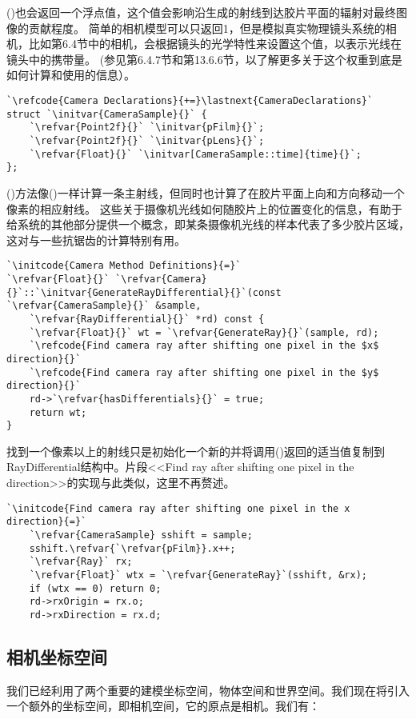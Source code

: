()也会返回一个浮点值，这个值会影响沿生成的射线到达胶片平面的辐射对最终图像的贡献程度。
简单的相机模型可以只返回1，但是模拟真实物理镜头系统的相机，比如第6.4节中的相机，会根据镜头的光学特性来设置这个值，以表示光线在镜头中的携带量。
(参见第6.4.7节和第13.6.6节，以了解更多关于这个权重到底是如何计算和使用的信息）。
\begin{lstlisting}
`\refcode{Camera Declarations}{+=}\lastnext{CameraDeclarations}`
struct `\initvar{CameraSample}{}` {
    `\refvar{Point2f}{}` `\initvar{pFilm}{}`;
    `\refvar{Point2f}{}` `\initvar{pLens}{}`;
    `\refvar{Float}{}` `\initvar[CameraSample::time]{time}{}`;
};
\end{lstlisting}
()方法像()一样计算一条主射线，但同时也计算了在胶片平面上向和方向移动一个像素的相应射线。
这些关于摄像机光线如何随胶片上的位置变化的信息，有助于给系统的其他部分提供一个概念，即某条摄像机光线的样本代表了多少胶片区域，这对与一些抗锯齿的计算特别有用。
\begin{lstlisting}
`\initcode{Camera Method Definitions}{=}`
`\refvar{Float}{}` `\refvar{Camera}{}`::`\initvar{GenerateRayDifferential}{}`(const `\refvar{CameraSample}{}` &sample,
    `\refvar{RayDifferential}{}` *rd) const {
    `\refvar{Float}{}` wt = `\refvar{GenerateRay}{}`(sample, rd);
    `\refcode{Find camera ray after shifting one pixel in the $x$ direction}{}`
    `\refcode{Find camera ray after shifting one pixel in the $y$ direction}{}`
    rd->`\refvar{hasDifferentials}{}` = true;
    return wt;
}
\end{lstlisting}

找到一个像素以上的射线只是初始化一个新的并将调用()返回的适当值复制到RayDifferential结构中。片段<<Find ray after shifting one pixel in the  direction>>的实现与此类似，这里不再赘述。
\begin{lstlisting}
`\initcode{Find camera ray after shifting one pixel in the x direction}{=}`
    `\refvar{CameraSample} sshift = sample;
    sshift.\refvar{`\refvar{pFilm}}.x++;
    `\refvar{Ray}` rx;
    `\refvar{Float}` wtx = `\refvar{GenerateRay}`(sshift, &rx);
    if (wtx == 0) return 0;
    rd->rxOrigin = rx.o;
    rd->rxDirection = rx.d;
\end{lstlisting}


\subsection{相机坐标空间}\label{sub:相机坐标空间}
我们已经利用了两个重要的建模坐标空间，物体空间和世界空间。我们现在将引入一个额外的坐标空间，即相机空间，它的原点是相机。我们有：

